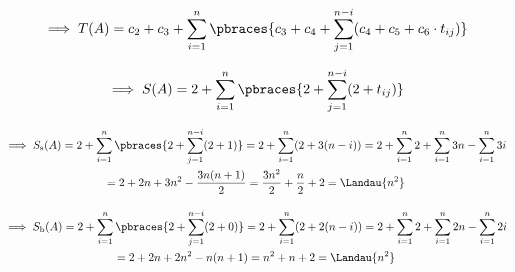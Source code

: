 \begin{solution}
\begin{enumerate}[label = (\alph*)]
  \begin{align*}
    \implies
    T(A) = c_2 + c_3 + \sum_{i=1}^n \pbraces{c_3 + c_4 + \sum_{j=1}^{n-i} (c_4 + c_5 + c_6 \cdot t_{ij})} \\
  \end{align*}

  \begin{align*}
    \implies
    S(A) = 2 + \sum_{i=1}^n \pbraces{2 + \sum_{j=1}^{n-i} (2 + t_{ij})}
  \end{align*}

  \begin{multline*}
    \implies
    S_{\mathrm{s}}(A)
    =
    2 + \sum_{i=1}^n \pbraces {2 + \sum_{j=1}^{n-i} (2 + 1)}
    =
    2 + \sum_{i=1}^n (2 + 3(n-i))
    =
    2 + \sum_{i=1}^n 2 + \sum_{i=1}^n 3n - \sum_{i=1}^n 3i \\
    =
    2 + 2n + 3n^2 - \frac{3n (n + 1)}{2}
    =
    \frac{3n^2}{2} + \frac{n}{2} + 2
    =
    \Landau{n^2}
  \end{multline*}

  \begin{multline*}
    \implies
    S_{\mathrm{b}}(A)
    =
    2 + \sum_{i=1}^n \pbraces {2 + \sum_{j=1}^{n-i} (2 + 0)}
    =
    2 + \sum_{i=1}^n (2 + 2(n-i))
    =
    2 + \sum_{i=1}^n 2 + \sum_{i=1}^n 2n - \sum_{i=1}^n 2i \\
    =
    2 + 2n + 2n^2 - n (n + 1)
    =
    n^2 + n + 2
    =
    \Landau{n^2}
  \end{multline*}

\end{enumerate}

\end{solution}

